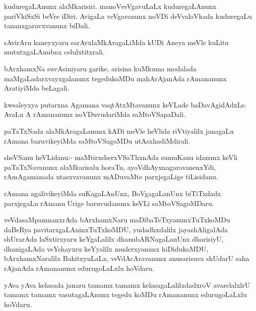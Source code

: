\documentclass{article}
\begin{document}
\begin{mn}%
kuduregaLAnunx alaMkarisiri. manoVveVgavuLaLx kuduregaLAnunx pariVkiSxSi beVre iDiri. AvigaLa
veVgavanunx noVDi deVvaloVkada kuduregaLu tananxgaravxvanunx biDali.
\end{mn}

\begin{mn}%
sAvirAru kaneyxyaru sarAvxlaMkAragaLiMda kUDi Aneya meVle kuLitu mututxgaLAnubnx 
celulxtitxrali.
\end{mn}

\begin{mn}%
bArxhamxNa suvAsiniyaru garike, arisina kuMkuma modalada maMgaLadarxvayxgalanunx 
tegedukoMDu mahArAjanAda rAmananunx AratiyiMda beLagali.
\end{mn}

\begin{mn}%
kwsaleyxya putarxna Agamana vaqtAtxMtavanunx keVLade baDavAgidAdxLe. AvaLu A rAmananunx 
noVDuvudariMda saMtoVSapaDali.
\end{mn}

\begin{mn}%
paTaTxNada alaMkAragaLanunx kADi meVle heVlida riVtiyalilx janagaLu rAmana baruvikeyiMda 
saMtoVSagoMDu utAsxhadiMdirali.
\end{mn}

\begin{mn}%
sheVSanu heVLidanu:- maMtirxsherxVSaThxnAda sumuKanu idanunx keVli paTaTxNavanunx 
alaMkarisalu horaTu, ayoVdhAyxnagaravanenxYdi, rAmAgamanada utasxvavanunx mADuvaMte 
parxjegaLige tiLisidanu.
\end{mn}

\begin{mn}%
rAmana agalivikeyiMda suKagaLAnUnx, BoVgagaLanUnx biTiTxdadx parxjegaLu rAmanu Urige 
baruvudanunx keVLi saMtoVSagoMDaru.
\end{mn}

\begin{mn}%
veVdasaMpamnanxrAda bArxhamxNaru maDibaTeTxyanunxTuTxkoMDu daBeRya 
pavitarxgaLAninxTuTxkoMDU, yudadhxdalilx jayashAligalAda shUrarAda laSxtirxyaru keYgaLalilx 
dhanubARNagaLanUnx dharisiyU, dhanigaLAda veYshayxru keYyalilx muderxyanunx hiDidukoMDU, 
bArxhamxNaralilx BakitxyuLaLx, veVdAcAravanunx anusarisuva shUdarU saha rAjanAda rAmananunx 
edurugoLaLxlu hoVdaru.
\end{mn}

\begin{mn}%
yAva yAva kelasada janaru tamamx tamamx kelasagaLalilxdadxroV avarelalxlrU tamamx tamamx 
vasutagaLAnunx tegedu koMDu rAmananunx edurugoLaLxlu hoVdaru.
\end{mn}
\end{document}
